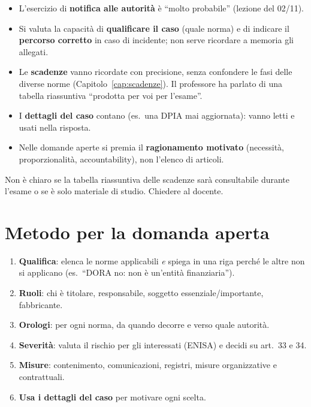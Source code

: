 \begin{itemize}
  \item L'esercizio di \textbf{notifica alle autorità} è ``molto probabile'' (lezione del 02/11).
  \item Si valuta la capacità di \textbf{qualificare il caso} (quale norma) e di indicare il
    \textbf{percorso corretto} in caso di incidente; non serve ricordare a memoria gli allegati.
  \item Le \textbf{scadenze} vanno ricordate con precisione, senza confondere le fasi delle diverse
    norme (Capitolo~\ref{cap:scadenze}). Il professore ha parlato di una tabella riassuntiva
    ``prodotta per voi per l'esame''.
  \item I \textbf{dettagli del caso} contano (es.\ una DPIA mai aggiornata): vanno letti e usati nella
    risposta.
  \item Nelle domande aperte si premia il \textbf{ragionamento motivato} (necessità, proporzionalità,
    accountability), non l'elenco di articoli.
\end{itemize}

\begin{verifica}
Non è chiaro se la tabella riassuntiva delle scadenze sarà consultabile durante l'esame o se è solo
materiale di studio. Chiedere al docente.
\end{verifica}

\section{Metodo per la domanda aperta}

\begin{enumerate}
  \item \textbf{Qualifica}: elenca le norme applicabili \emph{e} spiega in una riga perché le altre
    non si applicano (es.\ ``DORA no: non è un'entità finanziaria'').
  \item \textbf{Ruoli}: chi è titolare, responsabile, soggetto essenziale/importante, fabbricante.
  \item \textbf{Orologi}: per ogni norma, da quando decorre e verso quale autorità.
  \item \textbf{Severità}: valuta il rischio per gli interessati (ENISA) e decidi su art.~33 e 34.
  \item \textbf{Misure}: contenimento, comunicazioni, registri, misure organizzative e contrattuali.
  \item \textbf{Usa i dettagli del caso} per motivare ogni scelta.
\end{enumerate}
